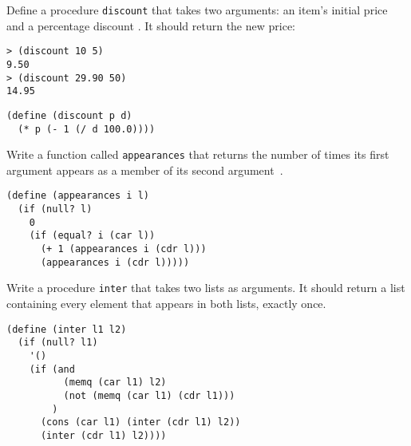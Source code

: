 \begin{questions}
\begin{solution}
\end{solution}


\question
Define a procedure \texttt{discount} that takes two arguments: an item’s initial price and a percentage discount \cite{simplyscheme}.
It should return the new price:
\begin{verbatim}
> (discount 10 5)
9.50
> (discount 29.90 50)
14.95
\end{verbatim}


\begin{solution}
  \begin{verbatim}
(define (discount p d)
  (* p (- 1 (/ d 100.0))))
  \end{verbatim}
\end{solution}

\question
Write a function called \texttt{appearances} that returns the number of times its first argument appears as a member of its second argument~\cite{simplyscheme}.

\begin{solution}
  \begin{verbatim}
(define (appearances i l)
  (if (null? l)
    0
    (if (equal? i (car l))  
      (+ 1 (appearances i (cdr l)))
      (appearances i (cdr l)))))   
  \end{verbatim}
\end{solution}

\question
Write a procedure \texttt{inter} that takes two lists as arguments.
It should return a list containing every element that appears in both lists, exactly once.

\begin{solution}
  \begin{verbatim}
(define (inter l1 l2)
  (if (null? l1)
    '()
    (if (and 
          (memq (car l1) l2)
          (not (memq (car l1) (cdr l1)))
        )
      (cons (car l1) (inter (cdr l1) l2))
      (inter (cdr l1) l2))))
  \end{verbatim}
\end{solution}


\end{questions}
